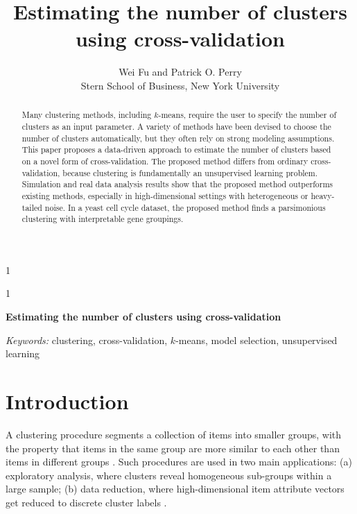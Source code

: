 \documentclass[12pt]{article}
\newcommand{\blind}{1}
\begin{document}
%

\def\spacingset#1{\renewcommand{\baselinestretch}%
{#1}\small\normalsize} \spacingset{1}



\blind
{
  \title{\bf Estimating the number of clusters using cross-validation}
  \author{Wei Fu and Patrick O. Perry \\
  Stern School of Business, New York University}
  \maketitle
} \fi

\blind
{
  \bigskip
  \bigskip
  \bigskip
  \begin{center}
    {\LARGE\bf Estimating the number of clusters using cross-validation}
\end{center}
  \medskip
} \fi

\bigskip
\begin{abstract}
Many clustering methods, including $k$-means, require the user to specify the
number of clusters as an input parameter. A variety of methods have been
devised to choose the number of clusters automatically, but they often rely on
strong modeling assumptions. This paper proposes a data-driven approach to
estimate the number of clusters based on a novel form of cross-validation. The
proposed method differs from ordinary cross-validation, because clustering is
fundamentally an unsupervised learning problem. Simulation and real data
analysis results show that the proposed method outperforms existing methods,
especially in high-dimensional settings with heterogeneous or heavy-tailed
noise. In a yeast cell cycle dataset, the proposed method finds a parsimonious
clustering with interpretable gene groupings.
\end{abstract}

\noindent%
{\it Keywords:} clustering, cross-validation, $k$-means, model selection, unsupervised learning
\vfill

\newpage
\spacingset{1.45} %
\section{Introduction}
\label{sec:intro}

A clustering procedure segments a collection of items into smaller groups,
with the property that items in the same group are more similar to each other
than items in different groups \citep{hartigan1975clustering}.  Such
procedures are used in two main applications: (a) exploratory analysis, where clusters
reveal homogeneous sub-groups within a large sample; (b) data
reduction, where high-dimensional item attribute vectors get reduced to discrete
cluster labels \citep{jain1999data}.
\end{document}
